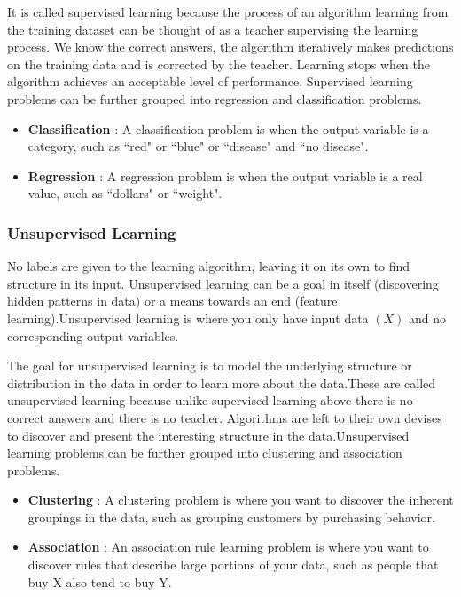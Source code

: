 It is called supervised learning because the process of an algorithm learning from the training
dataset can be thought of as a teacher supervising the learning process. We know the correct
answers, the algorithm iteratively makes predictions on the training data and is corrected by the
teacher. Learning stops when the algorithm achieves an acceptable level of performance. Supervised
learning problems can be further grouped into regression and classification problems.

\begin{itemize}
\item \textbf{Classification} : A classification problem is when the output variable is a category, such as
``red" or ``blue" or ``disease" and ``no disease".
\item \textbf{Regression} : A regression problem is when the output variable is a real value, such as
``dollars" or ``weight".\\
\end{itemize}

\subsubsection{Unsupervised Learning}
No labels are given to the learning algorithm, leaving it on its own to find structure in its
input. Unsupervised learning can be a goal in itself (discovering hidden patterns in data) or a
means towards an end (feature learning).Unsupervised learning is where you only have input
data $(X)$ and no corresponding output variables.

The goal for unsupervised learning is to model the underlying structure or distribution in the
data in order to learn more about the data.These are called unsupervised learning because unlike
supervised learning above there is no correct answers and there is no teacher. Algorithms are left
to their own devises to discover and present the interesting structure in the data.Unsupervised
learning problems can be further grouped into clustering and association problems.

\begin{itemize}
\item \textbf{Clustering} : A clustering problem is where you want to discover the inherent groupings
in the data, such as grouping customers by purchasing behavior.
\item \textbf{Association} : An association rule learning problem is where you want to discover rules
that describe large portions of your data, such as people that buy X also tend to buy Y.\\
\end{itemize}

